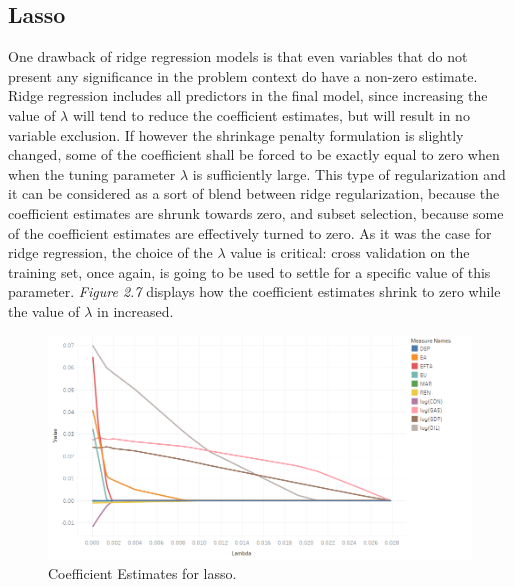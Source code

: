 \documentclass{book}
\begin{document}
\subsection{Lasso}

One drawback of ridge regression models is that even variables that do not present any significance in the problem context do have a non-zero estimate. Ridge regression includes all predictors in the final model, since increasing the value of $\lambda$ will tend to reduce the coefficient estimates, but will result in no variable exclusion. If however the shrinkage penalty formulation is slightly changed, some of the coefficient shall be forced to be exactly equal to zero when when the tuning parameter $\lambda$ is sufficiently large. This type of regularization and it can be considered as a sort of blend between ridge regularization, because the coefficient estimates are shrunk towards zero, and subset selection, because some of the coefficient estimates are effectively turned to zero. As it was the case for ridge regression, the choice of the $\lambda$ value is critical: cross validation on the training set, once again, is going to be used to settle for a specific value of this parameter. \textit{Figure 2.7} displays how the coefficient estimates shrink to zero while the value of $\lambda$ in increased.

\bigskip
\begin{figure}[H]
\begin{center}
\captionsetup{justification=centering}
\includegraphics[width=1\textwidth]{Images/lasso.png}
\caption{Coefficient Estimates for lasso.}
\end{center}
\end{figure}
\bigskip
\end{document}
